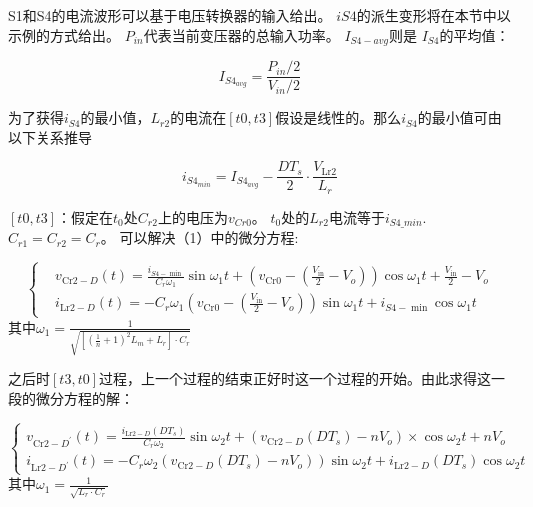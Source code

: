 \documentclass[12pt,a4paper]{report}
\begin{document}
S1和S4的电流波形可以基于电压转换器的输入给出。 $iS4$的派生变形将在本节中以示例的方式给出。 $P_{in}$代表当前变压器的总输入功率。 $I_{S4-avg}$则是 $I_{S4}$的平均值：

\begin{equation}
    I_{S4_{avg}} = \frac{P_{in}/2}{V_{in}/2}
\end{equation}

为了获得$i_{S4}$的最小值，$L_{r2}$的电流在$[t0,t3]$假设是线性的。那么$i_{S4}$的最小值可由以下关系推导

\begin{equation}
    i_{S4_{min}} =I_{S4_{avg}}-\frac{D T_{s}}{2} \cdot \frac{V_{\mathrm{Lr} 2}}{L_{r}}
\end{equation}

$[t0,t3]$：假定在$t_0$处$C_{r2}$上的电压为$v_{Cr0}$。 $t_0$处的$L_{r2}$电流等于$i_{S4\_min}$.$C_{r1} = C_{r2} = C_r$。 可以解决（1）中的微分方程:

\begin{equation}
    \left\{\begin{aligned}
         & v_{\mathrm{Cr} 2-D}(t)=\frac{i_{S 4-\min }}{C_{r} \omega_{1}} \sin \omega_{1} t+\left(v_{\mathrm{Cr} 0}-\left(\frac{V_{\mathrm{in}}}{2}-V_{o}\right)\right) \cos \omega_{1} t+\frac{V_{\mathrm{in}}}{2}-V_{o} \\
         & i_{\mathrm{Lr} 2-D}(t)=-C_{r} \omega_{1}\left(v_{\mathrm{Cr} 0}-\left(\frac{V_{\mathrm{in}}}{2}-V_{o}\right)\right) \sin \omega_{1} t +i_{S 4-\min } \cos \omega_{1} t
    \end{aligned}
    \right.
\end{equation}
其中$\omega_{1}=\frac{1}{\sqrt{\left[\left(\frac{1}{n}+1\right)^{2} L_{m}+L_{r}\right] \cdot C_{r}}}$

之后时$[t3,t0]$过程，上一个过程的结束正好时这一个过程的开始。由此求得这一段的微分方程的解：

\begin{equation}
    \left\{\begin{aligned}
        v_{\mathrm{Cr} 2-D^{\prime}}(t)=\frac{i_{\mathrm{Lr} 2-D}\left(D T_{s}\right)}{C_{r} \omega_{2}} \sin \omega_{2} t+\left(v_{\mathrm{Cr} 2-D}\left(D T_{s}\right)-n V_{o}\right)\times \cos \omega_{2} t+n V_{o} \\
        i_{\mathrm{Lr} 2-D^{\prime}}(t)=-\left.C_{r} \omega_{2}\left(v_{\mathrm{Cr} 2-D}\left(D T_{s}\right)-n V_{o}\right)\right) \sin \omega_{2} t+i_{\mathrm{Lr} 2-D}\left(D T_{s}\right) \cos \omega_{2} t
    \end{aligned}\right.
\end{equation}
其中$\omega_{1}=\frac{1}{\sqrt{L_r\cdot C_{r}}}$
\end{document}

